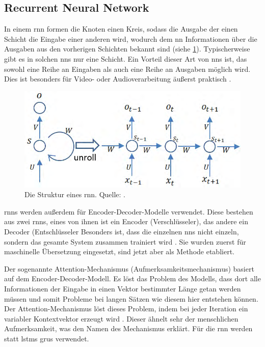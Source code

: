 \subsection{Recurrent Neural Network}\label{sub:rnn}
In einem \ac{rnn} formen die Knoten einen Kreis, sodass die Ausgabe der einen Schicht die Eingabe einer anderen wird,
wodurch dem \ac{nn} Informationen über die Ausgaben aus den vorherigen Schichten bekannt sind (siehe \cref{fig:struktur-rnn}).
Typischerweise gibt es in solchen \acp{nn} nur eine Schicht.
Ein Vorteil dieser Art von \acp{nn} ist, das sowohl eine Reihe an Eingaben als auch eine Reihe an Ausgaben möglich wird.
Dies ist besonders für Video- oder Audioverarbeitung äußerst praktisch \citep{deeplearningarchitecturesreview}.
\begin{figure}%
\centering
\includegraphics[width=\textwidth, height=\textheight, keepaspectratio]{Images/RNN.png}
\caption[Struktur von RNNs]{Die Struktur eines \ac{rnn}. Quelle: \citet{deeplearningarchitecturesreview}.}
\label{fig:struktur-rnn}
\end{figure}

\acp{rnn} werden außerdem für Encoder-Decoder-Modelle \citep{seq2seqB} verwendet.
Diese bestehen aus zwei \acp{rnn}, eines von ihnen ist ein Encoder (Verschlüsseler), das andere ein Decoder (Entschlüsseler
Besonders ist, dass die einzelnen \acp{nn} nicht einzeln, sondern das gesamte System zusammen trainiert wird \citep{seq2seqA}.
Sie wurden zuerst für maschinelle Übersetzung eingesetzt, sind jetzt aber als Methode etabliert.

Der sogenannte Attention-Mechanismus (Aufmerksamkeitsmechanismus) basiert auf dem Encoder-Decoder-Modell.
Es löst das Problem des Modells, dass dort alle Informationen der Eingabe in einen Vektor bestimmter Länge getan werden müssen
und somit Probleme bei langen Sätzen wie diesem hier entstehen können.
Der Attention-Mechanismus löst dieses Problem, indem bei jeder Iteration ein variabler Kontextvektor erzeugt wird \citep{attentionintro}.
Dieser ähnelt sehr der menschlichen Aufmerksamkeit, was den Namen des Mechanismus erklärt.
Für die \ac{rnn} werden statt \acsp{lstm} \acsp{gru} verwendet.

